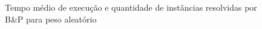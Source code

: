 \begin{figure}[t]%
    \centering
    \caption{Tempo médio de execução e quantidade de instâncias resolvidas por B\&P para peso aleatório}%
    \label{fig:time_inst_den-sf2_sf3-random}%
\end{figure}

